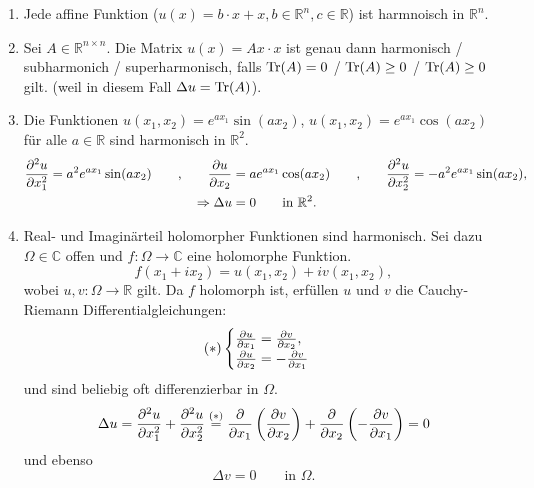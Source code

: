 \begin{beispiele}
	\begin{enumerate}[1.]
		\item Jede affine Funktion ($u(x) = b \cdot x + x, b \in \mathbb{R}^n , c \in \mathbb{R}$) ist harmnoisch in $\mathbb{R}^n$.
		\item Sei $A \in \mathbb{R}^{n \times n}$. Die Matrix $u(x) = Ax \cdot x$ ist genau dann harmonisch / subharmonich / superharmonisch, falls $ \operatorname{Tr}(A)= 0$ / $ \operatorname{Tr}(A) \geq  0 $ / $ \operatorname{Tr}(A) \geq  0 $ gilt. (weil in diesem Fall $\Delta u = \operatorname{Tr}(A)$).
		\item Die Funktionen $u(x_1,x_2)= e^{ax_1}\sin(ax_2)$, $u(x_1,x_2)= e^{ax_1} \cos(ax_2)$ für alle $a \in \mathbb{R}$ sind harmonisch in $\mathbb{R}^2$.
		\begin{align}
			\frac{{\partial ^2u}}{{\partial x_1^2}}  = a^2 e^{ax_1} \sin(ax_2) \qquad \text{,} \qquad \frac{{\partial u}}{{\partial x_2}}  &= a e^{ax_1} \cos(ax_2) 
			\qquad \text{,} \qquad \frac{{\partial ^2u}}{{\partial x_2^2}}  = - a^2 e^{ax_1} \sin(ax_2), \\
			\Rightarrow \Delta u &= 0 \qquad \text{in } \mathbb{R}^2.
		\end{align}
		\item Real- und Imaginärteil holomorpher Funktionen sind harmonisch. Sei dazu $\Omega \in \mathbb{C}$ offen und $f: \Omega \to \mathbb{C}$ eine holomorphe Funktion.
		\begin{equation}
			f ( x_1 + i x_2) = u(x_1,x_2) + i v(x_1,x_2), 
		\end{equation}
		wobei $u,v : \Omega \to  \mathbb{R}$ gilt. Da $f$ holomorph ist, erfüllen $u$ und $v$ die Cauchy-Riemann Differentialgleichungen:
		\begin{align}
			(*)
			\begin{cases}
				\frac{{\partial u}}{{\partial x_1}} = \frac{{\partial v}}{{\partial x_2}} , \\
				\frac{{\partial u}}{{\partial x_2}} = -\frac{{\partial v}}{{\partial x_1}} 	\label{(stern)}
			\end{cases}
		\end{align}
		und sind beliebig oft differenzierbar in $\Omega$.
		\begin{equation}
			\Delta u = \frac{{\partial ^2u}}{{\partial x_1^2}}  + \frac{{\partial ^2u}}{{\partial x_2^2}}  \stackrel{(*)}{=} \frac{{\partial }}{{\partial x_1}}  \left( \frac{{\partial v}}{{\partial x_2}}  \right) + \frac{{\partial }}{{\partial x_2}}  \left( - \frac{{\partial v}}{{\partial x_1}}  \right) = 0
		\end{equation}
		und ebenso
		\[
			\Delta v = 0 \qquad \text{in } \Omega.
		\]
	\end{enumerate}
\end{beispiele}

